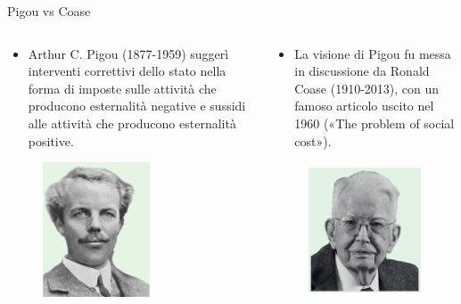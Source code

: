 \documentclass[aspectratio=64,12pt]{beamer}
\begin{document}
\begin{frame}{Pigou vs Coase}
\begin{columns}
\begin{column}{.5\columnwidth}
\begin{itemize}
\item Arthur C. Pigou (1877-1959) suggerì interventi correttivi dello stato nella
forma di imposte sulle attività che producono esternalità
negative e sussidi alle attività che producono esternalità positive.
\end{itemize}
\begin{figure}[htbp]
\centering
\includegraphics[height=4cm]{./figure/Pigou.png}
\end{figure}
\end{column}
\begin{column}{.5\columnwidth}
\begin{itemize}
\item La visione di Pigou fu messa in discussione da Ronald Coase (1910-2013), con
un famoso articolo uscito nel 1960 («The problem of social cost»).
\end{itemize}
\begin{figure}[htbp]
\centering
\includegraphics[height=4cm]{./figure/Coase.png}
\end{figure}
\end{column}
\end{columns}
\end{frame}
\end{document}

